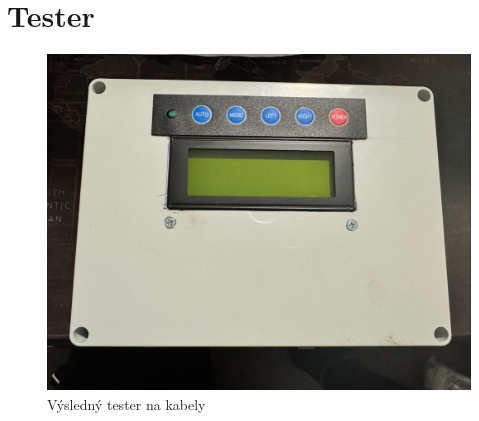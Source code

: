 
\section{Tester}
\begin{figure}[h!]
	\centering
	\includegraphics[width=\textwidth]{pictures/tester-top.jpeg}
    	\caption{Výsledný tester na kabely}
   	\label{fig:tester}
\end{figure}

